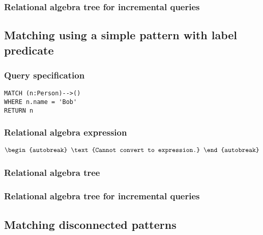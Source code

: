 
\subsubsection*{Relational algebra tree for incremental queries}


\subsection{Matching using a simple pattern with label predicate}

\subsubsection*{Query specification}

\begin{lstlisting}
MATCH (n:Person)-->()
WHERE n.name = 'Bob'
RETURN n
\end{lstlisting}

\subsubsection*{Relational algebra expression}

\begin{align*}
\begin{autobreak}
\text{Cannot convert to expression.}
\end{autobreak}
\end{align*}

\subsubsection*{Relational algebra tree}


\subsubsection*{Relational algebra tree for incremental queries}


\subsection{Matching disconnected patterns}

